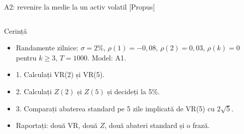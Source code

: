\begin{frame}{A2: revenire la medie la un activ volatil [Propus]}
\propsub
\itemsize{\scriptsize}
\begin{columns}[T]
\begin{column}{\taskw}
\begin{block}{Cerință}
\begin{itemize}
    \item Randamente zilnice: $\sigma = 2\%$, $\rho(1) = -0{,}08$, $\rho(2) = 0{,}03$, $\rho(k) = 0$ pentru $k \ge 3$, $T = 1000$. Model: A1.
    \item 1. Calculați VR(2) și VR(5).
    \item 2. Calculați $Z(2)$ și $Z(5)$ și decideți la 5\%.
    \item 3. Comparați abaterea standard pe 5 zile implicată de VR(5) cu $2\sqrt5$.
    \item Raportați: două VR, două $Z$, două abateri standard și o frază.
\end{itemize}
\end{block}
\end{column}
\begin{column}{\solw}
\end{column}
\end{columns}
\end{frame}

